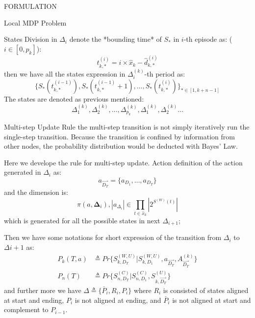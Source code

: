 \documentclass[10pt, conference, letterpaper]{IEEEtran}
\begin{document}
\begin{section}{FORMULATION}
\begin{subsection}{Local MDP Problem}
\begin{subsubsection}{States Division in $\Delta_i$}
                denote the *bounding time* of $S_*$ in $i$-th episode as: ($i \in [0, p_k]$):
                $$
                t^{(i)}_{k,*} = i \times \hat{x}_k - \hat{d}^{(i)}_{k,*}
                $$
                then we have all the states expression in $\Delta^{(k)}_i$-th period as:
                $$
                \{ S_*(t^{(i-1)}_{k,*}), S_*(t^{(i-1)}_{k,*}+1), \dots, S_*(t^{(i)}_{k,*}) \}_{* \in [1,k+n-1]}
                $$
                The states are denoted as previous mentioned:
                $$
                \Delta^{(k)}_{1}, \Delta^{(k)}_{2}, \dots, \Delta^{(k)}_{p_k}, \Delta^{(k)}_{1}, \Delta^{(k)}_{2}\dots
                $$
            \end{subsubsection}

            \begin{subsubsection}{Multi-step Update Rule}
                the multi-step transition is not simply iteratively run the single-step transition. Because the transition is confined by information from other nodes, the probability distribution would be deducted with Bayes' Law.

                Here we develope the rule for multi-step update.
                Action definition of the action generated in $\Delta_{i}$ as:
                $$
                a_{\vec{D_T}} = \{ a_{D_1}, \dots, a_{D_T} \}
                $$
                and the dimension is:
                $$
                \pi(a, \mathbf{\Delta}_i), |a_{\Delta_i}| \in \prod_{t \in \hat{x}_k} |2^{S^{(W)}(t)}|
                $$
                which is generated for all the possible states in next $\Delta_{i+1}$;

                Then we have some notations for short expression of the transition from $\Delta_{i}$ to $\Delta{i+1}$ as:
                \begin{align}
                    P_k(T,a) &\triangleq Pr\{ S^{(W,U)}_{k,D_T}|S^{(W,U)}_{k,D_1}, a_{\vec{D_T}},A^{(k)}_{\vec{D_T} }\}
                    \\
                    P_n(T) &\triangleq Pr\{ S^{(C)}_{n,D_T}|S^{(C)}_{n,D_1}, S^{(U)}_{k,\vec{D_T}} \}
                \end{align}
                and further more we have $\Delta \triangleq \{ \bar{P}_i, R_i, P_i \}$ where $R_i$ is consisted of states aligned at start and ending, $P_i$ is not aligned at ending, and $\bar{P}_i$ is not aligned at start and complement to $P_{i-1}$.


\end{subsubsection}
\end{subsection}
\end{section}
\end{document}
